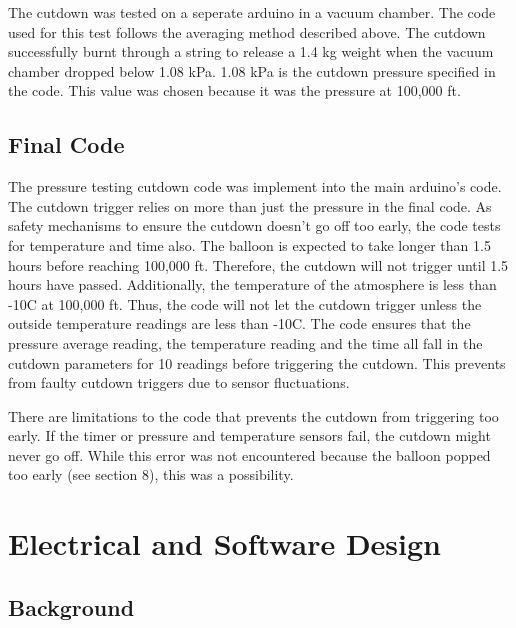 \documentclass[12pt,]{article}
\begin{document}
The cutdown was tested on a seperate arduino in a vacuum chamber. The
code used for this test follows the averaging method described above.
The cutdown successfully burnt through a string to release a 1.4 kg
weight when the vacuum chamber dropped below 1.08 kPa. 1.08 kPa is the
cutdown pressure specified in the code. This value was chosen because it
was the pressure at 100,000 ft.

\subsection{Final Code}\label{final-code}

The pressure testing cutdown code was implement into the main arduino's
code. The cutdown trigger relies on more than just the pressure in the
final code. As safety mechanisms to ensure the cutdown doesn't go off
too early, the code tests for temperature and time also. The balloon is
expected to take longer than 1.5 hours before reaching 100,000 ft.
Therefore, the cutdown will not trigger until 1.5 hours have passed.
Additionally, the temperature of the atmosphere is less than
-10\degree C at 100,000 ft. Thus, the code will not let the cutdown
trigger unless the outside temperature readings are less than
-10\degree C. The code ensures that the pressure average reading, the
temperature reading and the time all fall in the cutdown parameters for
10 readings before triggering the cutdown. This prevents from faulty
cutdown triggers due to sensor fluctuations.

There are limitations to the code that prevents the cutdown from
triggering too early. If the timer or pressure and temperature sensors
fail, the cutdown might never go off. While this error was not
encountered because the balloon popped too early (see section 8), this
was a possibility.

\section{Electrical and Software
Design}\label{electrical-and-software-design}

\subsection{Background}\label{background-1}
\end{document}
